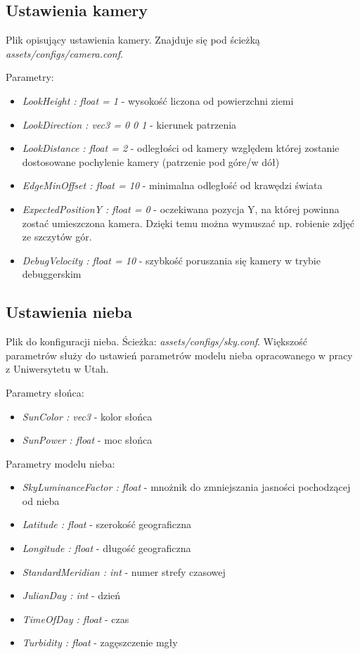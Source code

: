 \documentclass[inz,longabstract]{iithesis}
\begin{document}
        \subsection{Ustawienia kamery}
        Plik opisujący ustawienia kamery. Znajduje się pod ścieżką
        \textit{assets/configs/camera.conf}.
        
        Parametry:
        \begin{itemize}
            \item \textit{LookHeight : float = 1} - wysokość liczona od  powierzchni ziemi 
            \item \textit{LookDirection : vec3 = 0 0 1} - kierunek patrzenia 
            \item \textit{LookDistance : float = 2} - odległości od kamery względem której zostanie dostosowane pochylenie kamery (patrzenie pod góre/w dół)
            \item \textit{EdgeMinOffset : float = 10} - minimalna odległość od krawędzi świata  
            \item \textit{ExpectedPositionY : float = 0} - oczekiwana pozycja Y, na której powinna zostać umieszczona kamera. Dzięki temu można wymuszać np. robienie zdjęć ze szczytów gór. 
            \item \textit{DebugVelocity : float = 10} - szybkość poruszania się kamery w trybie debuggerskim
        \end{itemize}
        
        \subsection{Ustawienia nieba}
        Plik do konfiguracji nieba. Ścieżka: 
        \textit{assets/configs/sky.conf}. Większość parametrów służy do ustawień parametrów modelu nieba opracowanego w pracy z Uniwersytetu w Utah\cite{sky}.
        
        Parametry słońca:
        \begin{itemize}
            \item \textit{SunColor : vec3} - kolor słońca 
            \item \textit{SunPower : float} - moc słońca
        \end{itemize}
        
        Parametry modelu nieba:
        \begin{itemize}
            \item \textit{SkyLuminanceFactor : float} - mnożnik do zmniejszania jasności pochodzącej od nieba
            \item \textit{Latitude : float} - szerokość geograficzna
            \item \textit{Longitude : float} - długość geograficzna
            \item \textit{StandardMeridian : int} - numer strefy czasowej
            \item \textit{JulianDay : int} - dzień
            \item \textit{TimeOfDay : float} - czas
            \item \textit{Turbidity : float} - zagęszczenie mgły 
        \end{itemize}
        
\end{document}
